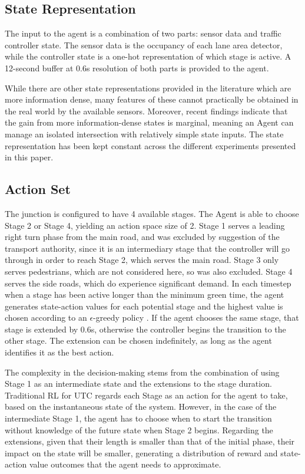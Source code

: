 \documentclass[conference]{IEEEtran}
\begin{document}
\subsection{State Representation}
The input to the agent is a combination of two parts: sensor data and traffic controller state. 
The sensor data is the occupancy of each lane area detector, while the controller state is a one-hot representation of which stage is active.
A 12-second buffer at 0.6s resolution of both parts is provided to the agent.

While there are other state representations provided in the literature which are more information dense, many features of these cannot practically be obtained in the real world by the available sensors.
Moreover, recent findings \cite{genders2018} indicate that the gain from more information-dense states is marginal, meaning an Agent can manage an isolated intersection with relatively simple state inputs.
The state representation has been kept constant across the different experiments presented in this paper.

\subsection{Action Set}
The junction is configured to have 4 available stages. The Agent is able to choose Stage 2 or Stage 4, yielding an action space size of 2.
Stage 1 serves a leading right turn phase from the main road, and was excluded by suggestion of the transport authority, since it is an intermediary stage that the controller will go through in order to reach Stage 2, which serves the main road.
Stage 3 only serves pedestrians, which are not considered here, so was also excluded.
Stage 4 serves the side roads, which do experience significant demand.
In each timestep when a stage has been active longer than the minimum green time, the agent generates state-action values for each potential stage and the highest value is chosen according to an $\epsilon$-greedy policy \cite{suttonbarto}. If the agent chooses the same stage, that stage is extended by 0.6s, otherwise the controller begins the transition to the other stage.
The extension can be chosen indefinitely, as long as the agent identifies it as the best action.

The complexity in the decision-making stems from the combination of using Stage 1 as an intermediate state and the extensions to the stage duration.
Traditional RL for UTC regards each Stage as an action for the agent to take, based on the instantaneous state of the system.
However, in the case of the intermediate Stage 1, the agent has to choose when to start the transition without knowledge of the future state when Stage 2 begins.
Regarding the extensions, given that their length is smaller than that of the initial phase, their impact on the state will be smaller, generating a distribution of reward and state-action value outcomes that the agent needs to approximate.
\end{document}
